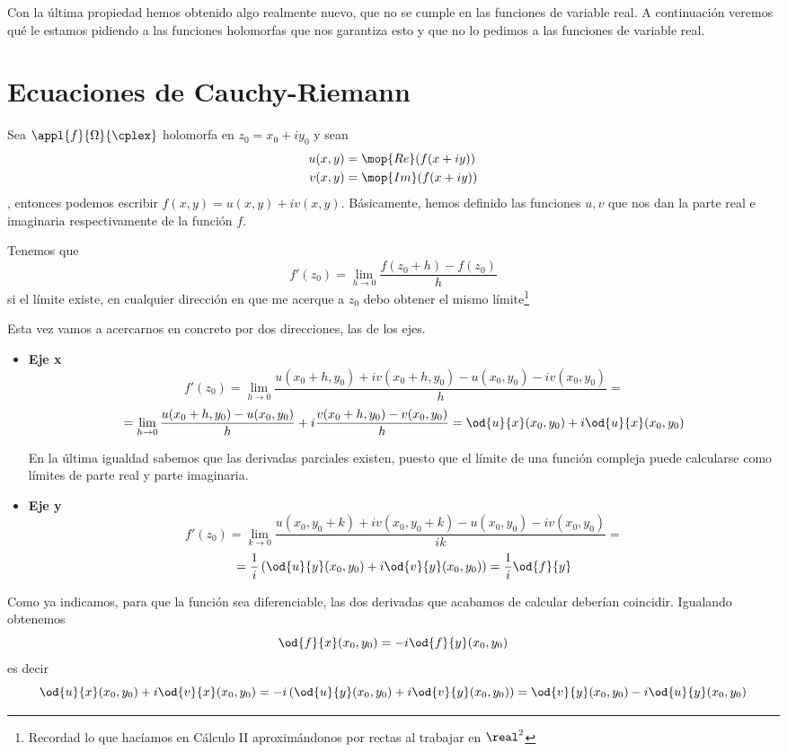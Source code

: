\documentclass{apuntes}
\begin{document}
Con la última propiedad hemos obtenido algo realmente nuevo, que no se cumple en las funciones de variable real. A continuación veremos qué le estamos pidiendo a las funciones holomorfas que nos garantiza esto y que no lo pedimos a las funciones de variable real.


\section{Ecuaciones de Cauchy-Riemann}
Sea $\appl{f}{\Omega}{\cplex}$ holomorfa en $z_0=x_0+iy_0$ y sean
\begin{align*}
u(x,y) &= \mop{Re}(f(x+iy)) \\
v(x,y) &= \mop{Im}(f(x+iy))
\end{align*}, entonces podemos escribir $f(x,y)=u(x,y)+iv(x,y)$. Básicamente, hemos definido las funciones $u,v$ que nos dan la parte real e imaginaria respectivamente de la función $f$.

Tenemos que
\[f'(z_0)=\lim_{h \to 0} \frac{f(z_0+h)-f(z_0)}{h}\]
si el límite existe, en cualquier dirección en que me acerque a $z_0$ debo obtener el mismo límite\footnote{Recordad lo que hacíamos en Cálculo II aproximándonos por rectas al trabajar en $\real^2$}

Esta vez vamos a acercarnos en concreto por dos direcciones, las de los ejes.
\begin{itemize}
\item \textbf{Eje x}
\[f'(z_0)=\lim_{h \to 0} \frac{u(x_0+h,y_0)+iv(x_0+h,y_0)-u(x_0, y_0)-iv(x_0,y_0)}{h}=\]
\[= \lim_{h \to 0}\frac{u(x_0+h,y_0)-u(x_0, y_0)}{h}+i\frac{v(x_0+h,y_0)-v(x_0,y_0)}{h}=\od{u}{x}(x_0,y_0)+i\od{u}{x}(x_0,y_0)\]

En la última igualdad sabemos que las derivadas parciales existen, puesto que el límite de una función compleja puede calcularse como límites de parte real y parte imaginaria.

\item \textbf{Eje y}
\[f'(z_0)=\lim_{k \to 0} \frac{u(x_0,y_0+k)+iv(x_0,y_0+k)-u(x_0, y_0)-iv(x_0,y_0)}{ik}=\]
\[=\frac{1}{i}\left(\od{u}{y}(x_0,y_0)+i \od{v}{y}(x_0, y_0)\right)=\frac{1}{i}\od{f}{y}\]
\end{itemize}

Como ya indicamos, para que la función sea diferenciable, las dos derivadas que acabamos de calcular deberían coincidir. Igualando obtenemos
\[\od{f}{x}(x_0,y_0)= -i \od{f}{y} (x_0,y_0)\]
es decir
\[\od{u}{x}(x_0,y_0)+i\od{v}{x}(x_0,y_0)=-i\left(\od{u}{y}(x_0,y_0)+i\od{v}{y}(x_0,y_0)\right)=\od{v}{y}(x_0,y_0)-i\od{u}{y}(x_0,y_0)\]
\end{document}
